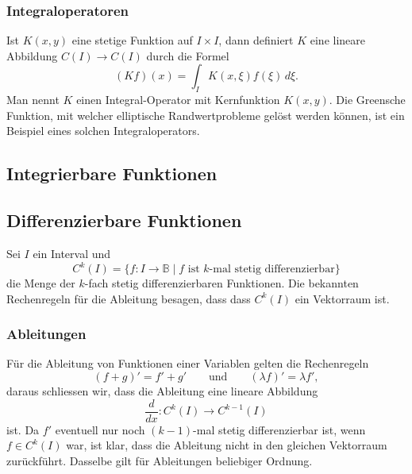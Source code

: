 \subsubsection{Integraloperatoren}
Ist $K(x,y)$ eine stetige Funktion auf $I\times I$, dann definiert $K$
eine lineare Abbildung $C(I)\to C(I)$ durch die Formel
\[
(Kf)(x) = \int_I K(x,\xi)f(\xi)\,d\xi.
\]
Man nennt $K$ einen Integral-Operator mit Kernfunktion $K(x,y)$.
Die Greensche Funktion, mit welcher elliptische Randwertprobleme
gelöst werden können, ist ein Beispiel eines solchen Integraloperators.

\subsection{Integrierbare Funktionen}

\subsection{Differenzierbare Funktionen}
Sei $I$ ein Interval und 
\[
C^k(I)
=
\{
f\colon I\to\mathbb B\;|\;
\text{$f$ ist $k$-mal stetig differenzierbar}
\}
\]
die Menge der $k$-fach stetig differenzierbaren Funktionen.
Die bekannten Rechenregeln für die Ableitung besagen, dass
dass $C^k(I)$ ein Vektorraum ist.

\subsubsection{Ableitungen}
Für die Ableitung von Funktionen einer Variablen gelten die
Rechenregeln
\[
(f+g)'=f'+g'
\qquad\text{und}\qquad
(\lambda f)' = \lambda f',
\]
daraus schliessen wir, dass die Ableitung eine lineare Abbildung
\[
\frac{d}{dx} \colon C^k(I)\to C^{k-1}(I)
\]
ist.
Da $f'$ eventuell nur noch $(k-1)$-mal stetig differenzierbar ist, wenn
$f\in C^k(I)$ war, ist klar, dass die Ableitung nicht in den gleichen
Vektorraum zurückführt.
Dasselbe gilt für Ableitungen beliebiger Ordnung.

